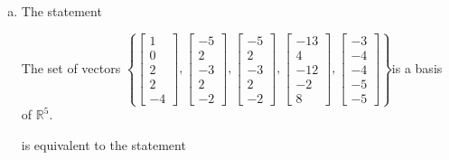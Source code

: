 \begin{exerciseAnswer}
\begin{enumerate}[(a)]
\item The statement 
\begin{center}\begin{minipage}{0.8\textwidth}
 The set of vectors \( \left\{ \left[\begin{array}{c}
1 \\
0 \\
2 \\
2 \\
-4
\end{array}\right] , \left[\begin{array}{c}
-5 \\
2 \\
-3 \\
2 \\
-2
\end{array}\right] , \left[\begin{array}{c}
-5 \\
2 \\
-3 \\
2 \\
-2
\end{array}\right] , \left[\begin{array}{c}
-13 \\
4 \\
-12 \\
-2 \\
8
\end{array}\right] , \left[\begin{array}{c}
-3 \\
-4 \\
-4 \\
-5 \\
-5
\end{array}\right] \right\} \)is a basis of \(\mathbb{R}^5\). 
\end{minipage}\end{center}
     is equivalent to the statement 
\begin{center}\begin{minipage}{0.8\textwidth}
 The set of vectors \( \left\{ \left[\begin{array}{c}
1 \\
0 \\
2 \\
2 \\
-4
\end{array}\right] , \left[\begin{array}{c}
-5 \\
2 \\

\end{array}
\end{minipage}
\end{center}
\end{enumerate}
\end{exerciseAnswer}
